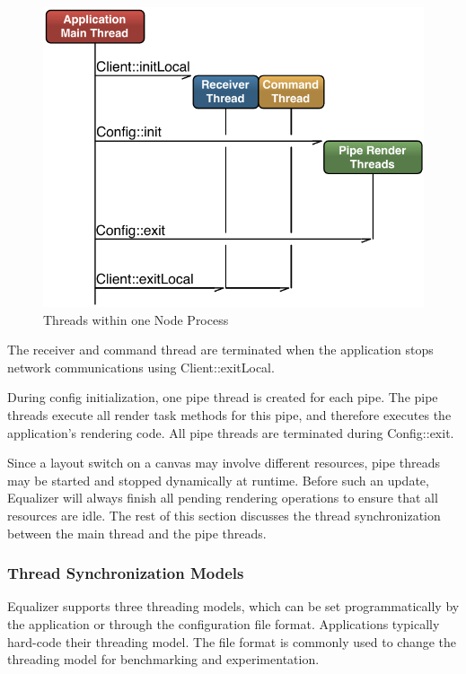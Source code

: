 \documentclass[10pt,a4]{scrartcl}
\begin{document}
\begin{figure}
  \includegraphics[width=.618\textwidth]{images/threads.pdf}
  {\caption{\label{fThreads}Threads within one Node Process}}
\end{figure}
The receiver and command thread are terminated when the application
stops network communications using \textsf{Client::exitLocal}.

During config initialization, one pipe thread is created for each pipe. The pipe
threads execute all render task methods for this pipe, and therefore executes
the application's rendering code. All pipe threads are terminated during
\textsf{Config::exit}.

Since a layout switch on a canvas may involve different resources, pipe threads
may be started and stopped dynamically at runtime. Before such an update,
Equalizer will always finish all pending rendering operations to ensure that all
resources are idle. The rest of this section discusses the thread
synchronization between the main thread and the pipe threads.


\subsubsection{\label{sThreadModel}Thread Synchronization Models}
Equalizer supports three threading models, which can be set
programmatically by the application or through the configuration file
format. Applications typically hard-code their threading model. The file
format is commonly used to change the threading model for benchmarking
and experimentation.
\end{document}
